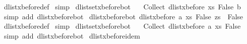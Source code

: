 \begin{isabellebody}
%
\isadelimproof
%
\endisadelimproof
%
\isatagproof
{}\isamarkupfalse%
\ dlist{\isacharunderscore}xbefore{\isacharunderscore}def\isanewline
{}\isamarkupfalse%
\ simp%
\endisatagproof
{\isafoldproof}%
%
\isadelimproof
\isanewline
%
\endisadelimproof
\isanewline
{}\isamarkupfalse%
\ dlistset{\isacharunderscore}xbefore{\isacharunderscore}bot{\isacharunderscore}{}{\isacharcolon}\ \isanewline
\ \ {\isachardoublequoteopen}Collect\ {\isacharparenleft}dlist{\isacharunderscore}xbefore\ {\isacharparenleft}{\isasymlambda}xs{\isachardot}\ False{\isacharparenright}\ b{\isacharparenright}\ {\isacharequal}\ {\isacharbraceleft}{\isacharbraceright}{\isachardoublequoteclose}\isanewline
%
\isadelimproof
%
\endisadelimproof
%
\isatagproof
{}\isamarkupfalse%
\ {\isacharparenleft}simp\ add{\isacharcolon}\ dlist{\isacharunderscore}xbefore{\isacharunderscore}bot{\isacharunderscore}{}{\isacharparenright}%
\endisatagproof
{\isafoldproof}%
%
\isadelimproof
\isanewline
%
\endisadelimproof
\isanewline
\isanewline
\isanewline
{}\isamarkupfalse%
\ dlist{\isacharunderscore}xbefore{\isacharunderscore}bot{\isacharunderscore}{}{\isacharcolon}\ {\isachardoublequoteopen}dlist{\isacharunderscore}xbefore\ a\ {\isacharparenleft}{\isasymlambda}xs{\isachardot}\ False{\isacharparenright}\ zs\ {\isacharequal}\ False{\isachardoublequoteclose}\isanewline
%
\isadelimproof
%
\endisadelimproof
%
\isatagproof
{}\isamarkupfalse%
\ dlist{\isacharunderscore}xbefore{\isacharunderscore}def\isanewline
{}\isamarkupfalse%
\ simp%
\endisatagproof
{\isafoldproof}%
%
\isadelimproof
\isanewline
%
\endisadelimproof
\isanewline
{}\isamarkupfalse%
\ dlistset{\isacharunderscore}xbefore{\isacharunderscore}bot{\isacharunderscore}{}{\isacharcolon}\ \isanewline
\ \ {\isachardoublequoteopen}Collect\ {\isacharparenleft}dlist{\isacharunderscore}xbefore\ a\ {\isacharparenleft}{\isasymlambda}xs{\isachardot}\ False{\isacharparenright}{\isacharparenright}\ {\isacharequal}\ {\isacharbraceleft}{\isacharbraceright}{\isachardoublequoteclose}\isanewline
%
\isadelimproof
%
\endisadelimproof
%
\isatagproof
{}\isamarkupfalse%
\ {\isacharparenleft}simp\ add{\isacharcolon}\ dlist{\isacharunderscore}xbefore{\isacharunderscore}bot{\isacharunderscore}{}{\isacharparenright}%
\endisatagproof
{\isafoldproof}%
%
\isadelimproof
\isanewline
%
\endisadelimproof
\isanewline
{}\isamarkupfalse%
\ dlist{\isacharunderscore}xbefore{\isacharunderscore}idem{\isacharcolon}\ \isanewline

\end{isabellebody}
